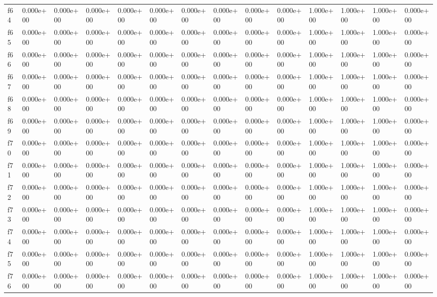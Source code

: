 \begin{table}
\begin{tabular}{llllllllllllll}
f64 & 0.000e+00 & 0.000e+00 & 0.000e+00 & 0.000e+00 & 0.000e+00 & 0.000e+00 & 0.000e+00 & 0.000e+00 & 0.000e+00 & 1.000e+00 & 1.000e+00 & 1.000e+00 & 0.000e+00 \\
f65 & 0.000e+00 & 0.000e+00 & 0.000e+00 & 0.000e+00 & 0.000e+00 & 0.000e+00 & 0.000e+00 & 0.000e+00 & 0.000e+00 & 1.000e+00 & 1.000e+00 & 1.000e+00 & 0.000e+00 \\
f66 & 0.000e+00 & 0.000e+00 & 0.000e+00 & 0.000e+00 & 0.000e+00 & 0.000e+00 & 0.000e+00 & 0.000e+00 & 0.000e+00 & 1.000e+00 & 1.000e+00 & 1.000e+00 & 0.000e+00 \\
f67 & 0.000e+00 & 0.000e+00 & 0.000e+00 & 0.000e+00 & 0.000e+00 & 0.000e+00 & 0.000e+00 & 0.000e+00 & 0.000e+00 & 1.000e+00 & 1.000e+00 & 1.000e+00 & 0.000e+00 \\
f68 & 0.000e+00 & 0.000e+00 & 0.000e+00 & 0.000e+00 & 0.000e+00 & 0.000e+00 & 0.000e+00 & 0.000e+00 & 0.000e+00 & 1.000e+00 & 1.000e+00 & 1.000e+00 & 0.000e+00 \\
f69 & 0.000e+00 & 0.000e+00 & 0.000e+00 & 0.000e+00 & 0.000e+00 & 0.000e+00 & 0.000e+00 & 0.000e+00 & 0.000e+00 & 1.000e+00 & 1.000e+00 & 1.000e+00 & 0.000e+00 \\
f70 & 0.000e+00 & 0.000e+00 & 0.000e+00 & 0.000e+00 & 0.000e+00 & 0.000e+00 & 0.000e+00 & 0.000e+00 & 0.000e+00 & 1.000e+00 & 1.000e+00 & 1.000e+00 & 0.000e+00 \\
f71 & 0.000e+00 & 0.000e+00 & 0.000e+00 & 0.000e+00 & 0.000e+00 & 0.000e+00 & 0.000e+00 & 0.000e+00 & 0.000e+00 & 1.000e+00 & 1.000e+00 & 1.000e+00 & 0.000e+00 \\
f72 & 0.000e+00 & 0.000e+00 & 0.000e+00 & 0.000e+00 & 0.000e+00 & 0.000e+00 & 0.000e+00 & 0.000e+00 & 0.000e+00 & 1.000e+00 & 1.000e+00 & 1.000e+00 & 0.000e+00 \\
f73 & 0.000e+00 & 0.000e+00 & 0.000e+00 & 0.000e+00 & 0.000e+00 & 0.000e+00 & 0.000e+00 & 0.000e+00 & 0.000e+00 & 1.000e+00 & 1.000e+00 & 1.000e+00 & 0.000e+00 \\
f74 & 0.000e+00 & 0.000e+00 & 0.000e+00 & 0.000e+00 & 0.000e+00 & 0.000e+00 & 0.000e+00 & 0.000e+00 & 0.000e+00 & 1.000e+00 & 1.000e+00 & 1.000e+00 & 0.000e+00 \\
f75 & 0.000e+00 & 0.000e+00 & 0.000e+00 & 0.000e+00 & 0.000e+00 & 0.000e+00 & 0.000e+00 & 0.000e+00 & 0.000e+00 & 1.000e+00 & 1.000e+00 & 1.000e+00 & 0.000e+00 \\
f76 & 0.000e+00 & 0.000e+00 & 0.000e+00 & 0.000e+00 & 0.000e+00 & 0.000e+00 & 0.000e+00 & 0.000e+00 & 0.000e+00 & 1.000e+00 & 1.000e+00 & 1.000e+00 & 0.000e+00 \\

\end{tabular}
\end{table}

